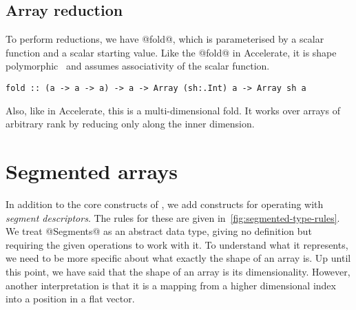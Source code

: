 \subsection{Array reduction}
To perform reductions, we have @fold@, which is parameterised by a scalar function and a scalar starting value. Like the @fold@ in Accelerate, it is shape polymorphic~\citep{Keller:Repa} and assumes associativity of the scalar function.
%
\begin{lstlisting}
fold :: (a -> a -> a) -> a -> Array (sh:.Int) a -> Array sh a
\end{lstlisting}
%
Also, like in Accelerate, this is a multi-dimensional fold. It works over arrays of arbitrary rank by  reducing only along the inner dimension.


\section{Segmented arrays}
In addition to the core constructs of \ndp{}, we add constructs for operating with \emph{segment descriptors}. The rules for these are given in~\ref{fig:segmented-type-rules}. We treat @Segments@ as an abstract data type, giving no definition but requiring the given operations to work with it. To understand what it represents, we need to be more specific about what exactly the shape of an array is. Up until this point, we have said that the shape of an array is its dimensionality. However, another interpretation is that it is a mapping from a higher dimensional index into a position in a flat vector.

